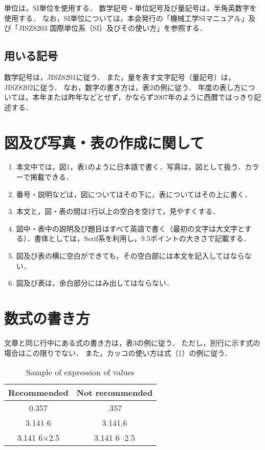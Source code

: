 \documentclass[a4paper, 10pt, dvips, fleqn, uplatex]{jsarticle}
\begin{document}
単位は，SI単位を使用する．
数学記号・単位記号及び量記号は，半角英数字を使用する．
なお，SI単位については，本会発行の「機械工学SIマニュアル」及び「JISZ8203 国際単位系（SI）及びその使い方」を参照する．


\subsection{用いる記号}

数学記号は，JISZ8201に従う．
また，量を表す文字記号（量記号）は，JISZ8202に従う．
なお，数字の書き方は，表2の例に従う．
年度の表し方については，本年または昨年などとせず，かならず2007年のように西暦ではっきり記述する．


\section{図及び写真・表の作成に関して}

\begin{enumerate}[(1)]
  \item 本文中では，図1，表1のように日本語で書く．写真は，図として扱う．カラーで掲載できる．
  \item 番号・説明などは，図についてはその下に，表についてはその上に書く．
  \item 本文と，図・表の間は1行以上の空白を空けて，見やすくする．
  \item 図中・表中の説明及び題目はすべて英語で書く（最初の文字は大文字とする）．書体としては，Serif系を利用し，9.5ポイントの大きさで記載する．
  \item 図及び表の横に空白ができても，その空白部には本文を記入してはならない．
  \item 図及び表は，余白部分にはみ出してはならない．
\end{enumerate}

\section{数式の書き方}

文章と同じ行中にある式の書き方は，表3の例に従う．
ただし，別行に示す式の場合はこの限りでない．
また，カッコの使い方は式（1）の例に従う．

\begin{table}[!hbtp]
  \begin{minipage}[c]{0.5\columnwidth}
    \centering
    \caption{Sample of expression of values}
    \begin{tabular}[t]{|c|c|}
      \hline
      Recommended & Not recommended \\
      \hline
      0.357 & .357 \\
      \hline
      3.141 6 & 3.141,6 \\
      \hline
      3.141 6×2.5 & 3.141 6 $\cdot$2.5 \\
      \hline
    \end{tabular}
  \end{minipage}
\end{table}
\end{document}
